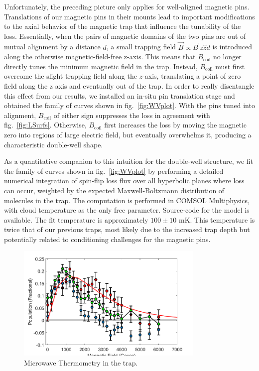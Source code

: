 \documentclass[%
 reprint,
 amsmath,amssymb,
 aps,
prl,
]{revtex4-1}
\begin{document}
Unfortunately, the preceding picture only applies for well-aligned magnetic pins. Translations of our magnetic pins in their mounts lead to important modifications to the axial behavior of the magnetic trap that influence the tunability of the loss. Essentially, when the pairs of magnetic domains of the two pins are out of mutual alignment by a distance $d$, a small trapping field $\vec{B}\propto B^\prime z\hat{z} d$ is introduced along the otherwise magnetic-field-free z-axis. This means that $B_\text{coil}$ no longer directly tunes the minimum magnetic field in the trap. Instead, $B_\text{coil}$ must first overcome the slight trapping field along the $z$-axis, translating a point of zero field along the z axis and eventually out of the trap. In order to really disentangle this effect from our results, we installed an in-situ pin translation stage and obtained the family of curves shown in fig.~\ref{fig:WVplot}. With the pins tuned into alignment, $B_\text{coil}$ of either sign suppresses the loss in agreement with fig.~\ref{fig:LSurfs}. Otherwise, $B_\text{coil}$ first increases the loss by moving the magnetic zero into regions of large electric field, but eventually overwhelms it, producing a characteristic double-well shape. 

As a quantitative companion to this intuition for the double-well structure, we fit the family of curves shown in fig.~\ref{fig:WVplot} by performing a detailed numerical integration of spin-flip loss flux over all hyperbolic planes where loss can occur, weighted by the expected Maxwell-Boltzmann distribution of molecules in the trap. The computation is performed in COMSOL Multiphysics, with cloud temperature as the only free parameter. Source-code for the model is available.\cite{githubCOMcode} The fit temperature is approximately $100\pm10\text{ mK}$. This temperature is twice that of our previous traps, most likely due to the increased trap depth but potentially related to conditioning challenges for the magnetic pins.

\begin{figure}
\includegraphics[width=90mm]{MW-thermometry.png}%
\caption{
Microwave Thermometry in the trap.
\label{fig:spec}}
\end{figure}
\end{document}
